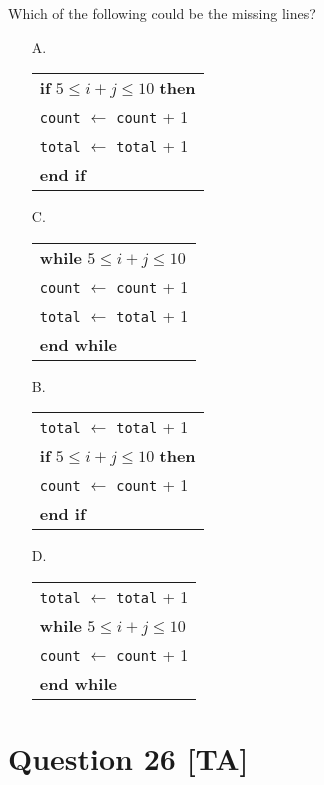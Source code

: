 \documentclass[10pt,a4paper]{article}
\begin{document}
Which of the following could be the missing lines?

\begin{enumerate}
    \item[A.] 
    \begin{tabular}[t]{l}
    \textbf{if} $5 \leq i+j \leq 10$ \textbf{then} \\
    \quad \texttt{count} $\leftarrow$ \texttt{count} + 1 \\
    \quad \texttt{total} $\leftarrow$ \texttt{total} + 1 \\
    \textbf{end if}
    \end{tabular}
    
    \item[C.] 
    \begin{tabular}[t]{l}
    \textbf{while} $5 \leq i+j \leq 10$ \\
    \quad \texttt{count} $\leftarrow$ \texttt{count} + 1 \\
    \quad \texttt{total} $\leftarrow$ \texttt{total} + 1 \\
    \textbf{end while}
    \end{tabular}
    
    \item[B.] 
    \begin{tabular}[t]{l}
    \texttt{total} $\leftarrow$ \texttt{total} + 1 \\
    \textbf{if} $5 \leq i+j \leq 10$ \textbf{then} \\
    \quad \texttt{count} $\leftarrow$ \texttt{count} + 1 \\
    \textbf{end if}
    \end{tabular}
    
    \item[D.] 
    \begin{tabular}[t]{l}
    \texttt{total} $\leftarrow$ \texttt{total} + 1 \\
    \textbf{while} $5 \leq i+j \leq 10$ \\
    \quad \texttt{count} $\leftarrow$ \texttt{count} + 1 \\
    \textbf{end while}
    \end{tabular}
\end{enumerate}

\vspace{9\baselineskip}

\hrulefill

\section*{Question 26 [TA]}
\end{document}
